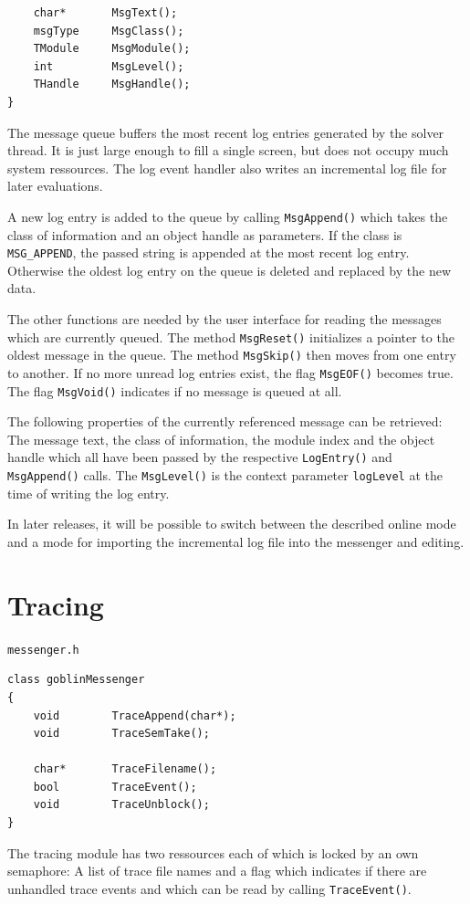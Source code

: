 \documentclass[a4paper,11pt,twoside]{book}
\begin{document}
\begin{multicols}{2}
\begin{mymethods}
\begin{verbatim}
    char*       MsgText();
    msgType     MsgClass();
    TModule     MsgModule(); 
    int         MsgLevel();
    THandle     MsgHandle();
}
\end{verbatim}
\end{mymethods}
The message queue buffers the most recent log entries generated by the solver
thread. It is just large enough to fill a single screen, but does not occupy
much system ressources. The log event handler also writes an incremental log
file for later evaluations.

A new log entry is added to the queue by calling \verb/MsgAppend()/ which takes
the class of information and an object handle as parameters. If the class is
\verb/MSG_APPEND/, the passed string is appended at the most recent log entry.
Otherwise the oldest log entry on the queue is deleted and replaced by the new
data.

The other functions are needed by the user interface for reading the messages
which are currently queued. The method \verb/MsgReset()/ initializes a pointer
to the oldest message in the queue. The method \verb/MsgSkip()/ then moves from
one entry to another. If no more unread log entries exist, the flag
\verb/MsgEOF()/ becomes true. The flag \verb/MsgVoid()/ indicates if no message
is queued at all.

The following properties of the currently referenced message can be retrieved:
The message text, the class of information, the module index and the object
handle which all have been passed by the respective \verb/LogEntry()/ and
\verb/MsgAppend()/ calls. The \verb/MsgLevel()/ is the context parameter
\verb/logLevel/ at the time of writing the log entry.

In later releases, it will be possible to switch between the described online
mode and a mode for importing the incremental log file into the messenger and
editing.


\section{Tracing}
\label{slb_msg_trace}
\myinclude\verb/messenger.h/
\begin{mymethods}
\begin{verbatim}
class goblinMessenger
{
    void        TraceAppend(char*);
    void        TraceSemTake();

    char*       TraceFilename();
    bool        TraceEvent();
    void        TraceUnblock();
}
\end{verbatim}
\end{mymethods}
The tracing module has two ressources each of which is locked by an own
semaphore: A list of trace file names and a flag which indicates if there are
unhandled trace events and which can be read by calling \verb/TraceEvent()/.


\end{multicols}
\end{document}
